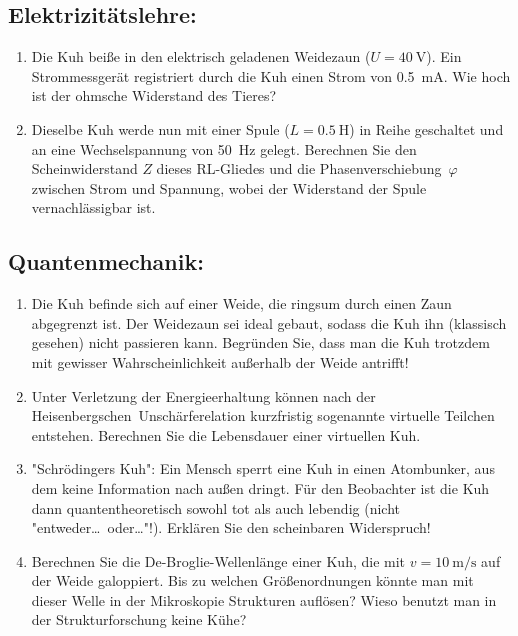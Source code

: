 \vspace{-0.2cm}
\subsection*{Elektrizitätslehre:}
\vspace{-0.1cm}
\begin{enumerate}[leftmargin=0.4cm]
\item Die Kuh beiße in den elektrisch geladenen Weidezaun ($U = \SI{40}{\V}$). Ein Strommessgerät registriert durch die Kuh einen Strom von \SI{0,5}{\mA}. Wie hoch ist der ohmsche Widerstand des Tieres?
\item Dieselbe Kuh werde nun mit einer Spule ($L = \SI{0,5}{\henry}$) in Reihe geschaltet und an eine Wechselspannung von \SI{50}{\Hz} gelegt. Berechnen Sie den Scheinwiderstand $Z$ dieses RL-Gliedes und die Phasenverschiebung~$\varphi$ zwischen Strom und Spannung, wobei der Widerstand der Spule vernachlässigbar ist.
\end{enumerate}

\vspace{-0.2cm}
\subsection*{Quantenmechanik:}
\vspace{-0.1cm}
\begin{enumerate}[leftmargin=0.4cm]
\item Die Kuh befinde sich auf einer Weide, die ringsum durch einen Zaun abgegrenzt ist. Der Weidezaun sei ideal gebaut, sodass die Kuh ihn (klassisch gesehen) nicht passieren kann. Begründen Sie, dass man die Kuh trotzdem mit gewisser Wahrscheinlichkeit außerhalb der Weide antrifft!
\item Unter Verletzung der Energieerhaltung können nach der Heisenbergschen~Unschärferelation kurzfristig sogenannte virtuelle Teilchen entstehen. Berechnen Sie die Lebensdauer einer virtuellen Kuh.
\item "Schrödingers Kuh": Ein Mensch sperrt eine Kuh in einen Atombunker, aus dem keine Information nach außen dringt. Für den Beobachter ist die Kuh dann quantentheoretisch sowohl tot als auch lebendig (nicht "entweder\dots\ oder\dots"!). Erklären Sie den scheinbaren Widerspruch!
\item Berechnen Sie die De-Broglie-Wellenlänge einer Kuh, die mit $v = \SI{10}{\m\per\s}$ auf der Weide galoppiert. Bis zu welchen Größenordnungen könnte man mit dieser Welle in der Mikroskopie Strukturen auflösen? Wieso benutzt man in der Strukturforschung keine Kühe?
\end{enumerate}

